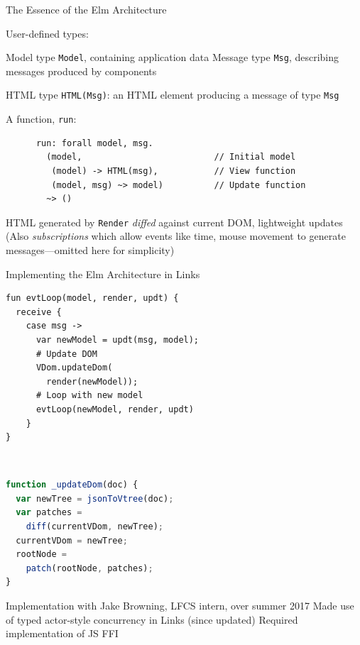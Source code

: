 \documentclass[11.5pt, aspectratio=169]{beamer}
\begin{document}
\begin{frame}[fragile]{The Essence of the Elm Architecture}

  \begin{fullpageitemize}
   User-defined types:
    \begin{itemize}
      \itemR Model type \verb+Model+, containing application data
      \itemR Message type \verb+Msg+, describing messages produced by components
    \end{itemize}
    \vspace{0em}

   HTML type \verb+HTML(Msg)+: an HTML element producing a message of
    type \verb+Msg+

   A function, \verb+run+:
    \begin{verbatim}
      run: forall model, msg.
        (model,                          // Initial model
         (model) -> HTML(msg),           // View function
         (model, msg) ~> model)          // Update function
        ~> ()
    \end{verbatim}

    \vspace{0em}

   HTML generated by \verb+Render+ \emph{diffed} against current DOM, lightweight updates
   (Also \emph{subscriptions} which allow events like time, mouse movement
    to generate messages---omitted here for simplicity)
  \end{fullpageitemize}
\end{frame}

\begin{frame}[fragile]{Implementing the Elm Architecture in Links}

  \begin{minipage}{0.475\textwidth}
  \begin{lstlisting}[language=links]
fun evtLoop(model, render, updt) {
  receive {
    case msg ->
      var newModel = updt(msg, model);
      # Update DOM
      VDom.updateDom(
        render(newModel));
      # Loop with new model
      evtLoop(newModel, render, updt)
    }
}
\end{lstlisting}
\end{minipage}
~\hfill
\begin{minipage}{0.5\textwidth}
\begin{lstlisting}[language=JavaScript]
function _updateDom(doc) {
  var newTree = jsonToVtree(doc);
  var patches =
    diff(currentVDom, newTree);
  currentVDom = newTree;
  rootNode =
    patch(rootNode, patches);
}
\end{lstlisting}
\end{minipage}

  \begin{fullpageitemize}
  \itemR Implementation with Jake Browning, LFCS intern, over summer 2017
  \itemR Made use of typed actor-style concurrency in Links (since updated)
  \itemR Required implementation of JS FFI
  \end{fullpageitemize}
\end{frame}
\end{document}
